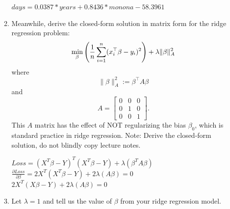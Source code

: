 \documentclass[a4paper]{article}
\theoremstyle{definition}
\newenvironment{soln}{
    \leavevmode\color{blue}\ignorespaces
}{}
\begin{document}
\begin{enumerate}
\begin{enumerate}
\begin{soln}
$days = 0.0387 * years + 0.8436 * monona -58.3961$
\end{soln}
\item
Meanwhile, derive the closed-form solution in matrix form for the ridge regression problem:
$$\min_\beta \left({1\over n} \sum_{i=1}^n (x_i^\top \beta - y_i)^2 \right) + \lambda \|\beta\|_A^2$$
where 
$$\|\beta\|_A^2 := \beta^\top A \beta$$
and
$$A=
\begin{bmatrix}
0 & 0 & 0 \\
0 & 1 & 0 \\
0 & 0 & 1
\end{bmatrix}.$$
This $A$ matrix has the effect of NOT regularizing the bias $\beta_0$, which is standard practice in ridge regression.
Note: Derive the closed-form solution, do not blindly copy lecture notes.

\begin{soln}
$Loss = (X^T\beta - Y)^T(X^T\beta - Y) + \lambda (\beta^T A \beta) $\\%

$\frac{\partial Loss}{\partial \beta} = 2X^T(X^T\beta - Y) +2 \lambda (A\beta) = 0$\\
$ 2X^T(X\beta - Y) +2 \lambda (A\beta) = 0$
\end{soln}
\item
Let $\lambda=1$ and tell us the value of $\beta$ from your ridge regression model.
\end{enumerate}

\end{enumerate}
\end{document}
